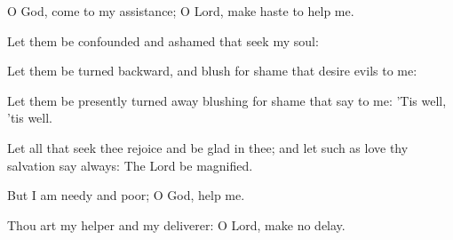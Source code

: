 ﻿\item O God, come to my assistance; O Lord, make haste to help me.
\item Let them be confounded and ashamed that seek my soul:
\item Let them be turned backward, and blush for shame that desire evils to me:
\item Let them be presently turned away blushing for shame that say to me: ’Tis well, ’tis well.
\item Let all that seek thee rejoice and be glad in thee; and let such as love thy salvation say always: The Lord be magnified.
\item But I am needy and poor; O God, help me.
\item Thou art my helper and my deliverer: O Lord, make no delay.